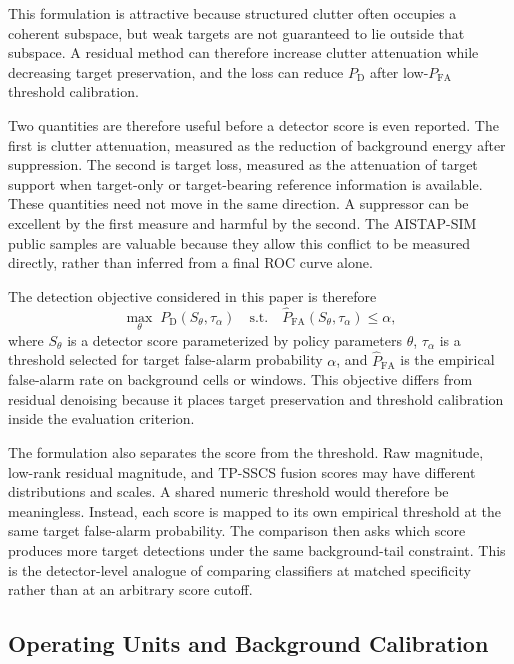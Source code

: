 \documentclass[journal]{IEEEtran}
\begin{document}
This formulation is attractive because structured clutter often occupies a coherent subspace, but weak targets are not guaranteed to lie outside that subspace. A residual method can therefore increase clutter attenuation while decreasing target preservation, and the loss can reduce $P_{\mathrm{D}}$ after low-$P_{\mathrm{FA}}$ threshold calibration.

Two quantities are therefore useful before a detector score is even reported. The first is clutter attenuation, measured as the reduction of background energy after suppression. The second is target loss, measured as the attenuation of target support when target-only or target-bearing reference information is available. These quantities need not move in the same direction. A suppressor can be excellent by the first measure and harmful by the second. The AISTAP-SIM public samples are valuable because they allow this conflict to be measured directly, rather than inferred from a final ROC curve alone.

The detection objective considered in this paper is therefore
\begin{equation}
    \max_{\theta} \; P_{\mathrm{D}}(S_\theta, \tau_\alpha)
    \quad \mathrm{s.t.} \quad
    \widehat{P}_{\mathrm{FA}}(S_\theta, \tau_\alpha) \leq \alpha ,
\end{equation}
where $S_\theta$ is a detector score parameterized by policy parameters $\theta$, $\tau_\alpha$ is a threshold selected for target false-alarm probability $\alpha$, and $\widehat{P}_{\mathrm{FA}}$ is the empirical false-alarm rate on background cells or windows. This objective differs from residual denoising because it places target preservation and threshold calibration inside the evaluation criterion.

The formulation also separates the score from the threshold. Raw magnitude, low-rank residual magnitude, and TP-SSCS fusion scores may have different distributions and scales. A shared numeric threshold would therefore be meaningless. Instead, each score is mapped to its own empirical threshold at the same target false-alarm probability. The comparison then asks which score produces more target detections under the same background-tail constraint. This is the detector-level analogue of comparing classifiers at matched specificity rather than at an arbitrary score cutoff.

\subsection{Operating Units and Background Calibration}
\end{document}
